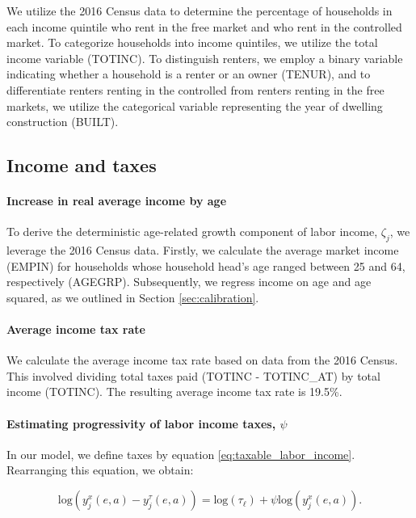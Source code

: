 \documentclass[parskip=full]{article}
\begin{document}
We utilize the 2016 Census data to determine the percentage of households in each income quintile who rent in the free market and who rent in the controlled market. To categorize households into income quintiles, we utilize the total income variable (TOTINC). To distinguish renters, we employ a binary variable indicating whether a household is a renter or an owner (TENUR), and to differentiate renters renting in the controlled from renters renting in the free markets, we utilize the categorical variable representing the year of dwelling construction (BUILT).

\subsection{Income and taxes}

\paragraph{Increase in real average income by age}

To derive the deterministic age-related growth component of labor income, $\zeta_{j}$, we leverage the 2016 Census data. Firstly, we calculate the average market income (EMPIN) for households whose household head's age ranged between 25 and 64, respectively (AGEGRP). Subsequently, we regress income on age and age squared, as we outlined in Section \ref{sec:calibration}.

\paragraph{Average income tax rate}

We calculate the average income tax rate based on data from the 2016 Census. This involved dividing total taxes paid (TOTINC - TOTINC\_AT) by total income (TOTINC). The resulting average income tax rate is 19.5\%.

\paragraph{Estimating progressivity of labor income taxes, $\psi$}

In our model, we define taxes by equation \eqref{eq:taxable_labor_income}. Rearranging this equation, we obtain:

\begin{equation}\label{eq:taxable_labor_income_regression}
  \mbox{log}(y^{x}_{j}(e,a)-y^{\tau}_{j}(e,a))=\mbox{log}(\tau_{\ell})+\psi \mbox{log}(y^{x}_{j}(e,a)).
\end{equation}
\end{document}
